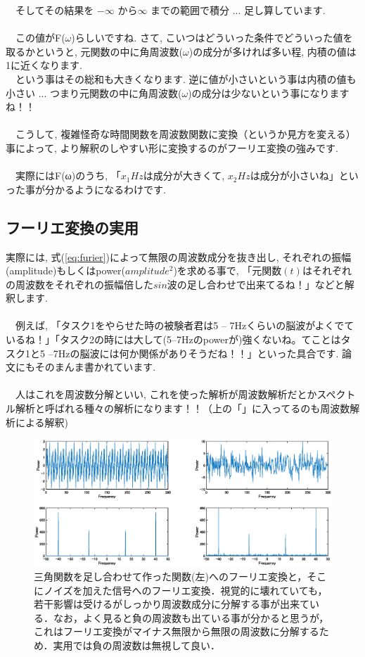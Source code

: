 \documentclass[11pt,a4paper]{ujreport} 	%
\begin{document}
　そしてその結果を $-\infty$ から$\infty$ までの範囲で積分 ... 足し算しています.\\\\
　この値がF($\omega$)らしいですね. さて, こいつはどういった条件でどういった値を取るかというと, 元関数の中に角周波数($\omega$)の成分が多ければ多い程, 内積の値は1に近くなります. \\
　という事はその総和も大きくなります. 逆に値が小さいという事は内積の値も小さい ... つまり元関数の中に角周波数($\omega$)の成分は少ないという事になりますね！！\\
\\
　こうして, 複雑怪奇な時間関数を周波数関数に変換（というか見方を変える）事によって, より解釈のしやすい形に変換するのがフーリエ変換の強みです.\\
\\
　実際にはF(ω)のうち, 「$x_1Hz$は成分が大きくて, $x_2Hz$は成分が小さいね」といった事が分かるようになるわけです.
\subsection{フーリエ変換の実用}
実際には, 式(\ref{eq:furier})によって無限の周波数成分を抜き出し, それぞれの振幅(amplitude)もしくはpower($amplitude^2$)を求める事で, 「元関数$(t)$はそれぞれの周波数をそれぞれの振幅倍した$sin$波の足し合わせで出来てるね！」などと解釈します.\\\\
　例えば, 「タスク1をやらせた時の被験者君は5 -- 7Hzくらいの脳波がよくでているね！」「タスク2の時には大して(5--7Hzのpowerが)強くないね。てことはタスク1と5 --7Hzの脳波には何か関係がありそうだね！！」といった具合です. 論文にもそのまんま書かれています.
\\\\
　人はこれを周波数分解といい, これを使った解析が周波数解析だとかスペクトル解析と呼ばれる種々の解析になります！！（上の「」に入ってるのも周波数解析による解釈)\\

\begin{figure}[H]
  \centering
  \includegraphics[width=15cm]{../figures/fourier.eps}
  \caption{三角関数を足し合わせて作った関数(左)へのフーリエ変換と，そこにノイズを加えた信号へのフーリエ変換．視覚的に壊れていても，若干影響は受けるがしっかり周波数成分に分解する事が出来ている．なお，よく見ると負の周波数も出ている事が分かると思うが，これはフーリエ変換がマイナス無限から無限の周波数に分解するため．実用では負の周波数は無視して良い．}
\end{figure}
\end{document}
